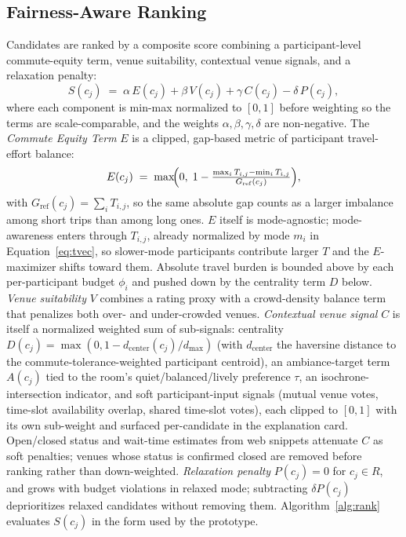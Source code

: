 \documentclass[sigconf]{acmart}
\begin{document}
\subsection{Fairness-Aware Ranking}
\label{sec:rank}

Candidates are ranked by a composite score combining a participant-level commute-equity term, venue suitability, contextual venue signals, and a relaxation penalty:
\begin{equation}
  S(c_j) \;=\; \alpha\, E(c_j) + \beta\, V(c_j) + \gamma\, C(c_j) - \delta\, P(c_j),
  \label{eq:score}
\end{equation}
where each component is min-max normalized to $[0,1]$ before weighting so the terms are scale-comparable, and the weights $\alpha,\beta,\gamma,\delta$ are non-negative. The \emph{Commute Equity Term} $E$ is a clipped, gap-based metric of participant travel-effort balance:
\begin{equation}
  E(c_j) \;=\; \max\!\Bigl(0,\; 1 - \tfrac{\max_i T_{i,j} - \min_i T_{i,j}}{G_{\mathrm{ref}}(c_j)}\Bigr),
  \label{eq:fair}
\end{equation}
with $G_{\mathrm{ref}}(c_j) = \sum_i T_{i,j}$, so the same absolute gap counts as a larger imbalance among short trips than among long ones. $E$ itself is mode-agnostic; mode-awareness enters through $T_{i,j}$, already normalized by mode $m_i$ in Equation~\eqref{eq:tvec}, so slower-mode participants contribute larger $T$ and the $E$-maximizer shifts toward them. Absolute travel burden is bounded above by each per-participant budget $\phi_i$ and pushed down by the centrality term $D$ below. \emph{Venue suitability} $V$ combines a rating proxy with a crowd-density balance term that penalizes both over- and under-crowded venues. \emph{Contextual venue signal} $C$ is itself a normalized weighted sum of sub-signals: centrality $D(c_j)=\max(0,1-d_{\mathrm{center}}(c_j)/d_{\max})$ (with $d_{\mathrm{center}}$ the haversine distance to the commute-tolerance-weighted participant centroid), an ambiance-target term $A(c_j)$ tied to the room's quiet/balanced/lively preference $\tau$, an isochrone-intersection indicator, and soft participant-input signals (mutual venue votes, time-slot availability overlap, shared time-slot votes), each clipped to $[0,1]$ with its own sub-weight and surfaced per-candidate in the explanation card. Open/closed status and wait-time estimates from web snippets attenuate $C$ as soft penalties; venues whose status is confirmed closed are removed before ranking rather than down-weighted. \emph{Relaxation penalty} $P(c_j)=0$ for $c_j \in R$, and grows with budget violations in relaxed mode; subtracting $\delta P(c_j)$ deprioritizes relaxed candidates without removing them. Algorithm~\ref{alg:rank} evaluates $S(c_j)$ in the form used by the prototype.
\end{document}
